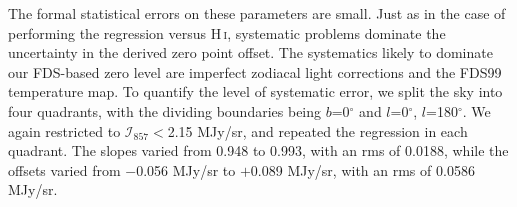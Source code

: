 \documentclass{emulateapj}
\newcommand{\PLANCK}{{\it Planck}}
\begin{document}
The formal statistical errors on these parameters are small. Just as in the 
case of performing the regression versus  H\,\textsc{i}, systematic problems 
dominate the uncertainty in the derived zero point offset. The systematics
likely to dominate our FDS-based zero level are imperfect zodiacal light 
corrections and the FDS99 temperature map. To quantify the level of systematic 
error, we split the sky into four quadrants, with the dividing boundaries being
$b$=0$^{\circ}$ and $l$=0$^{\circ}$, $l$=180$^{\circ}$. We again restricted to
$\mathcal{I}_{857}$$<$2.15 MJy/sr, and repeated the regression in each 
quadrant. The slopes varied from 0.948 to 0.993, with an rms of 0.0188, while 
the offsets varied from $-$0.056 MJy/sr to $+$0.089 MJy/sr, with an rms of 
0.0586 MJy/sr.






\end{document}
